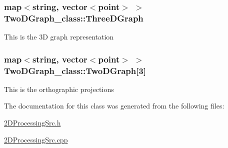 \subsubsection[{\texorpdfstring{Three\+D\+Graph}{ThreeDGraph}}]{\setlength{\rightskip}{0pt plus 5cm}map$<$string, vector$<${\bf point}$>$ $>$ Two\+D\+Graph\+\_\+class\+::\+Three\+D\+Graph}\hypertarget{classTwoDGraph__class_a6b9cd70ed1be50fb248b56f6da30a3c5}{}\label{classTwoDGraph__class_a6b9cd70ed1be50fb248b56f6da30a3c5}
This is the 3D graph representation 
\subsubsection[{\texorpdfstring{Two\+D\+Graph}{TwoDGraph}}]{\setlength{\rightskip}{0pt plus 5cm}map$<$string, vector$<${\bf point}$>$ $>$ Two\+D\+Graph\+\_\+class\+::\+Two\+D\+Graph\mbox{[}3\mbox{]}}\hypertarget{classTwoDGraph__class_aab69ccead28f685a9e084f52e1488354}{}\label{classTwoDGraph__class_aab69ccead28f685a9e084f52e1488354}
This is the orthographic projections 

The documentation for this class was generated from the following files\+:\begin{DoxyCompactItemize}
\item 
\hyperlink{2DProcessingSrc_8h}{2\+D\+Processing\+Src.\+h}\item 
\hyperlink{2DProcessingSrc_8cpp}{2\+D\+Processing\+Src.\+cpp}\end{DoxyCompactItemize}
